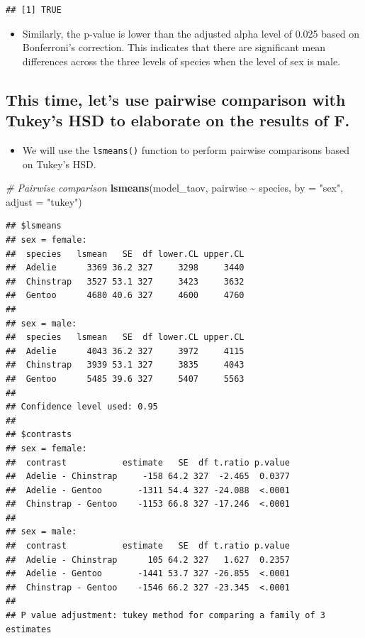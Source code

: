 \documentclass[
]{book}
\newenvironment{Shaded}{\begin{snugshade}}{\end{snugshade}}
\newcommand{\AttributeTok}[1]{\textcolor[rgb]{0.13,0.29,0.53}{#1}}
\newcommand{\CommentTok}[1]{\textcolor[rgb]{0.56,0.35,0.01}{\textit{#1}}}
\newcommand{\FunctionTok}[1]{\textcolor[rgb]{0.13,0.29,0.53}{\textbf{#1}}}
\newcommand{\NormalTok}[1]{#1}
\newcommand{\SpecialCharTok}[1]{\textcolor[rgb]{0.81,0.36,0.00}{\textbf{#1}}}
\newcommand{\StringTok}[1]{\textcolor[rgb]{0.31,0.60,0.02}{#1}}
\providecommand{\tightlist}{%
  \setlength{\itemsep}{0pt}\setlength{\parskip}{0pt}}
\begin{document}
\begin{verbatim}
## [1] TRUE
\end{verbatim}

\begin{itemize}
\tightlist
\item
  Similarly, the p-value is lower than the adjusted alpha level of 0.025 based on Bonferroni's correction. This indicates that there are significant mean differences across the three levels of species when the level of sex is male.
\end{itemize}

\subsection{This time, let's use pairwise comparison with Tukey's HSD to elaborate on the results of F.}\label{this-time-lets-use-pairwise-comparison-with-tukeys-hsd-to-elaborate-on-the-results-of-f.}

\begin{itemize}
\tightlist
\item
  We will use the \texttt{lsmeans()} function to perform pairwise comparisons based on Tukey's HSD.
\end{itemize}

\begin{Shaded}
\begin{Highlighting}[]
\CommentTok{\# Pairwise comparison}
\FunctionTok{lsmeans}\NormalTok{(model\_taov, pairwise }\SpecialCharTok{\textasciitilde{}}\NormalTok{ species, }\AttributeTok{by =} \StringTok{"sex"}\NormalTok{, }\AttributeTok{adjust =} \StringTok{"tukey"}\NormalTok{)}
\end{Highlighting}
\end{Shaded}

\begin{verbatim}
## $lsmeans
## sex = female:
##  species   lsmean   SE  df lower.CL upper.CL
##  Adelie      3369 36.2 327     3298     3440
##  Chinstrap   3527 53.1 327     3423     3632
##  Gentoo      4680 40.6 327     4600     4760
## 
## sex = male:
##  species   lsmean   SE  df lower.CL upper.CL
##  Adelie      4043 36.2 327     3972     4115
##  Chinstrap   3939 53.1 327     3835     4043
##  Gentoo      5485 39.6 327     5407     5563
## 
## Confidence level used: 0.95 
## 
## $contrasts
## sex = female:
##  contrast           estimate   SE  df t.ratio p.value
##  Adelie - Chinstrap     -158 64.2 327  -2.465  0.0377
##  Adelie - Gentoo       -1311 54.4 327 -24.088  <.0001
##  Chinstrap - Gentoo    -1153 66.8 327 -17.246  <.0001
## 
## sex = male:
##  contrast           estimate   SE  df t.ratio p.value
##  Adelie - Chinstrap      105 64.2 327   1.627  0.2357
##  Adelie - Gentoo       -1441 53.7 327 -26.855  <.0001
##  Chinstrap - Gentoo    -1546 66.2 327 -23.345  <.0001
## 
## P value adjustment: tukey method for comparing a family of 3 estimates
\end{verbatim}
\end{document}
